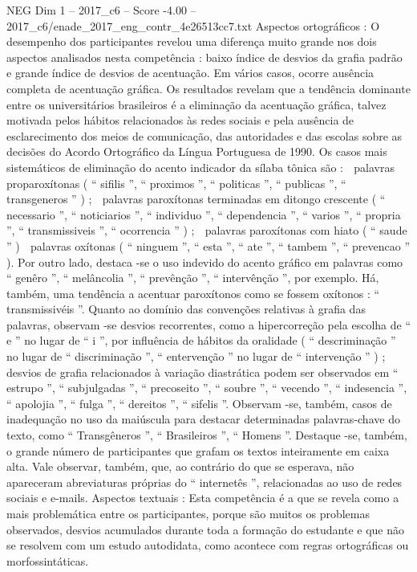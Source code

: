 \begin{textsample}{NEG Dim 1 – 2017\_c6 – Score -4.00 – 2017\_c6/enade\_2017\_eng\_contr\_4e26513cc7.txt}
Aspectos ortográficos : O desempenho dos participantes revelou uma diferença muito grande nos dois aspectos analisados nesta competência : baixo índice de desvios da grafia padrão e grande índice de desvios de acentuação.
Em vários casos, ocorre ausência completa de acentuação gráfica.
Os resultados revelam que a tendência dominante entre os universitários brasileiros é a eliminação da acentuação gráfica, talvez motivada pelos hábitos relacionados às redes sociais e pela ausência de esclarecimento dos meios de comunicação, das autoridades e das escolas sobre as decisões do Acordo Ortográfico da Língua Portuguesa de 1990.
Os casos mais sistemáticos de eliminação do acento indicador da sílaba tônica são :  palavras proparoxítonas ( “ sifilis ”, “ proximos ”, “ politicas ”, “ publicas ”, “ transgeneros ” ) ;  palavras paroxítonas terminadas em ditongo crescente ( “ necessario ”, “ noticiarios ”, “ individuo ”, “ dependencia ”, “ varios ”, “ propria ”, “ transmissiveis ”, “ ocorrencia ” ) ;  palavras paroxítonas com hiato ( “ saude ” )  palavras oxítonas ( “ ninguem ”, “ esta ”, “ ate ”, “ tambem ”, “ prevencao ” ).
Por outro lado, destaca -se o uso indevido do acento gráfico em palavras como “ genêro ”, “ melâncolia ”, “ prevênção ”, “ intervênção ”, por exemplo.
Há, também, uma tendência a acentuar paroxítonos como se fossem oxítonos : “ transmissivéis ”.
Quanto ao domínio das convenções relativas à grafia das palavras, observam -se desvios recorrentes, como a hipercorreção pela escolha de “ e ” no lugar de “ i ”, por influência de hábitos da oralidade ( “ descriminação ” no lugar de “ discriminação ”, “ entervenção ” no lugar de “ intervenção ” ) ; desvios de grafia relacionados à variação diastrática podem ser observados em “ estrupo ”, “ subjulgadas ”, “ precoseito ”, “ soubre ”, “ vecendo ”, “ indesencia ”, “ apolojia ”, “ fulga ”, “ dereitos ”, “ sifelis ”.
Observam -se, também, casos de inadequação no uso da maiúscula para destacar determinadas palavras-chave do texto, como “ Transgêneros ”, “ Brasileiros ”, “ Homens ”.
Destaque -se, também, o grande número de participantes que grafam os textos inteiramente em caixa alta.
Vale observar, também, que, ao contrário do que se esperava, não apareceram abreviaturas próprias do “ internetês ”, relacionadas ao uso de redes sociais e e-mails.
Aspectos textuais : Esta competência é a que se revela como a mais problemática entre os participantes, porque são muitos os problemas observados, desvios acumulados durante toda a formação do estudante e que não se resolvem com um estudo autodidata, como acontece com regras ortográficas ou morfossintáticas.

\end{textsample}
